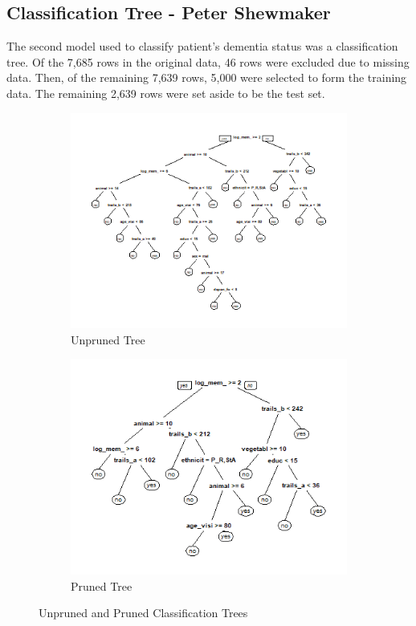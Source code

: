 \documentclass[a4paper,man,natbib,11pt]{article}
\begin{document}
\subsection{Classification Tree - Peter Shewmaker}

The second model used to classify patient's dementia status was a classification tree. Of the 7,685 rows in the original data, 46 rows were excluded due to missing data. Then, of the remaining 7,639 rows, 5,000 were selected to form the training data. The remaining 2,639 rows were set aside to be the test set.

\begin{figure}[h!]
\centering
\begin{subfigure}{.5\textwidth}
  \centering
  \includegraphics[width=\linewidth]{unpruned_tree.png}
  \caption{Unpruned Tree}
  \label{fig:sub1}
\end{subfigure}%
\begin{subfigure}{.5\textwidth}
  \centering
  \includegraphics[width=\linewidth]{pruned_tree.png}
  \caption{Pruned Tree}
  \label{fig:sub2}
\end{subfigure}
\caption{Unpruned and Pruned Classification Trees}
\label{fig:test}
\end{figure}
\end{document}
